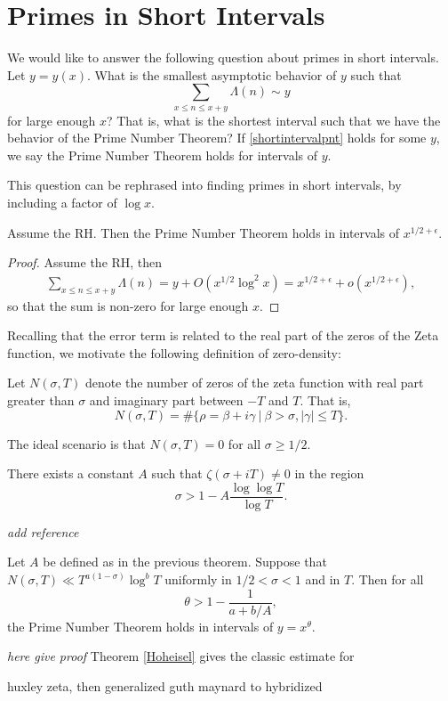 \section{Primes in Short Intervals}
We would like to answer the following question about primes in short intervals. Let $y=y(x)$. What is the smallest asymptotic behavior of $y$
such that \begin{equation}\label{shortintervalpnt}
\sum_{x\leq n \leq x+y} \Lambda(n) \sim y
\end{equation}
for large enough $x$? That is, what is the shortest interval such that we have the behavior of the Prime Number Theorem? If \ref{shortintervalpnt} holds for some $y$,
we say the Prime Number Theorem holds for intervals of $y$.
\begin{remark}
    This question can be rephrased into finding primes in short intervals, by including a factor of $\log x$. 
\end{remark} 
\begin{proposition}
    Assume the RH. Then the Prime Number Theorem holds in intervals of $x^{1/2+\epsilon}$.
\end{proposition}
\begin{proof}
    Assume the RH, then
    \begin{align*}
        \sum_{x\leq n \leq x+y} \Lambda(n)=
        y+O(x^{1/2}\log^2 x) = x^{1/2+\epsilon} + o(x^{1/2+\epsilon}),
    \end{align*}
    so that the sum is non-zero for large enough $x$.
\end{proof}
Recalling that the error term is related to the real part of the zeros of the Zeta function, we motivate the following definition of zero-density:
\begin{definition}
    Let $N(\sigma, T)$ denote the number of zeros of the zeta function with real part greater than $\sigma$ and imaginary part between $-T$ and $T$. That is,\[
        N(\sigma,T) = \# \{\rho = \beta + i\gamma \ | \ \beta >\sigma, |\gamma|\leq T\}.
    \]
\end{definition}
\begin{remark}
    The ideal scenario is that $N(\sigma,T)=0$ for all $\sigma\geq 1/2$. 
\end{remark}
\begin{theorem}[Chudakov] 
    There exists a constant $A$ such that $\zeta(\sigma+iT)\neq 0$ in the region \begin{equation*}
        \sigma > 1 - A\frac{\log \log T}{\log T}.
    \end{equation*}
\end{theorem}
\textit{add reference}
\begin{theorem}[Hoheisel] \label{Hoheisel}
    Let $A$ be defined as in the previous theorem.
    Suppose that $N(\sigma, T)\ll T^{a(1-\sigma)}\log^b T$ uniformly in $1/2<\sigma<1$ and in $T$. Then for all \[
        \theta > 1 - \frac{1}{a+b/A},
    \] the Prime Number Theorem holds in 
    intervals of $y=x^\theta$.
\end{theorem}

\textit{here give proof}
Theorem \ref{Hoheisel} gives the classic estimate for 

huxley zeta, then generalized guth maynard to hybridized 